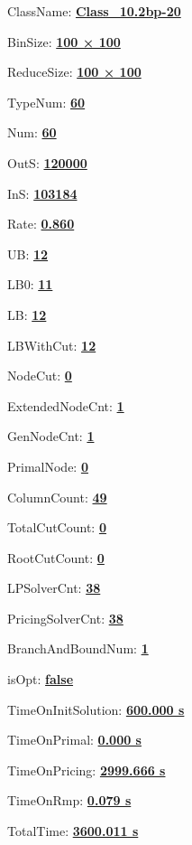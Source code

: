 \documentclass[11pt]{article}
\begin{document}
\pagestyle{empty}


ClassName: \underline{\textbf{Class_10.2bp-20}}
\par
BinSize: \underline{\textbf{100 × 100}}
\par
ReduceSize: \underline{\textbf{100 × 100}}
\par
TypeNum: \underline{\textbf{60}}
\par
Num: \underline{\textbf{60}}
\par
OutS: \underline{\textbf{120000}}
\par
InS: \underline{\textbf{103184}}
\par
Rate: \underline{\textbf{0.860}}
\par
UB: \underline{\textbf{12}}
\par
LB0: \underline{\textbf{11}}
\par
LB: \underline{\textbf{12}}
\par
LBWithCut: \underline{\textbf{12}}
\par
NodeCut: \underline{\textbf{0}}
\par
ExtendedNodeCnt: \underline{\textbf{1}}
\par
GenNodeCnt: \underline{\textbf{1}}
\par
PrimalNode: \underline{\textbf{0}}
\par
ColumnCount: \underline{\textbf{49}}
\par
TotalCutCount: \underline{\textbf{0}}
\par
RootCutCount: \underline{\textbf{0}}
\par
LPSolverCnt: \underline{\textbf{38}}
\par
PricingSolverCnt: \underline{\textbf{38}}
\par
BranchAndBoundNum: \underline{\textbf{1}}
\par
isOpt: \underline{\textbf{false}}
\par
TimeOnInitSolution: \underline{\textbf{600.000 s}}
\par
TimeOnPrimal: \underline{\textbf{0.000 s}}
\par
TimeOnPricing: \underline{\textbf{2999.666 s}}
\par
TimeOnRmp: \underline{\textbf{0.079 s}}
\par
TotalTime: \underline{\textbf{3600.011 s}}
\par
\newpage


\end{document}
